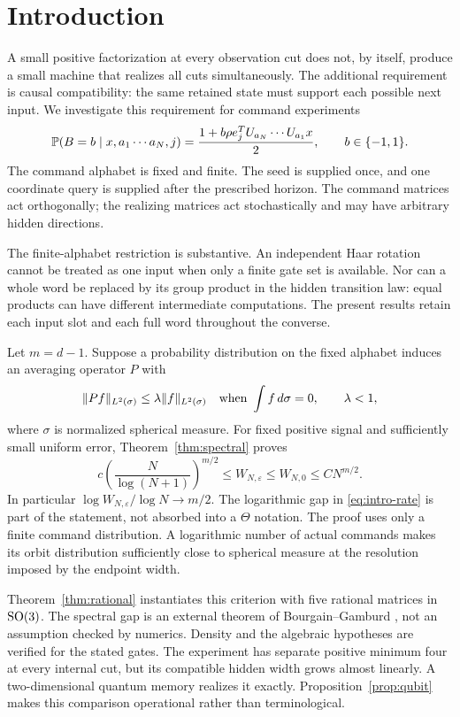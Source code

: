 \section{Introduction}
A small positive factorization at every observation cut does not, by
itself, produce a small machine that realizes all cuts simultaneously.
The additional requirement is causal compatibility: the same retained
state must support each possible next input. We investigate this
requirement for command experiments
\begin{equation}\label{eq:law}
 \mathbb P(B=b\mid x,a_1\cdots a_N,j)
 =\frac{1+b\rho e_j^TU_{a_N}\cdots U_{a_1}x}{2},\qquad b\in\{-1,1\}.
\end{equation}
The command alphabet is fixed and finite. The seed is supplied once,
and one coordinate query is supplied after the prescribed horizon.
The command matrices act orthogonally; the realizing matrices act
stochastically and may have arbitrary hidden directions.

The finite-alphabet restriction is substantive. An independent Haar
rotation cannot be treated as one input when only a finite gate set is
available. Nor can a whole word be replaced by its group product in the
hidden transition law: equal products can have different intermediate
computations. The present results retain each input slot and each full
word throughout the converse.

Let $m=d-1$. Suppose a probability distribution on the fixed alphabet
induces an averaging operator $P$ with
\begin{equation}\label{eq:intro-gap}
 \lVert Pf\rVert_{L^2(\sigma)}\le\lambda\lVert f\rVert_{L^2(\sigma)}
 \quad\text{when }\int f\,d\sigma=0,\qquad \lambda<1,
\end{equation}
where $\sigma$ is normalized spherical measure. For fixed positive
signal and sufficiently small uniform error, Theorem~\ref{thm:spectral}
proves
\begin{equation}\label{eq:intro-rate}
 c\left(\frac{N}{\log(N+1)}\right)^{m/2}
 \le W_{N,\varepsilon}\le W_{N,0}\le C N^{m/2}.
\end{equation}
In particular $\log W_{N,\varepsilon}/\log N\to m/2$.
The logarithmic gap in \eqref{eq:intro-rate} is part of the statement,
not absorbed into a $\Theta$ notation. The proof uses only a finite
command distribution. A logarithmic number of actual commands makes
its orbit distribution sufficiently close to spherical measure at the
resolution imposed by the endpoint width.

Theorem~\ref{thm:rational} instantiates this criterion with five rational
matrices in $\operatorname{SO}(3)$. The spectral gap is an external theorem of
Bourgain--Gamburd \cite{BG12}, not an assumption checked by numerics.
Density and the algebraic hypotheses are verified for the stated gates.
The experiment has separate positive minimum four at every internal cut,
but its compatible hidden width grows almost linearly. A two-dimensional
quantum memory realizes it exactly. Proposition~\ref{prop:qubit} makes
this comparison operational rather than terminological.

